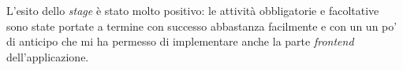 L'esito dello \textit{stage} è stato molto positivo: le attività obbligatorie e facoltative sono state portate a termine con successo abbastanza facilmente 
e con un un po' di anticipo che mi ha permesso di implementare anche la parte \textit{frontend} dell'applicazione.

%
%

\endgroup			

\vfill

